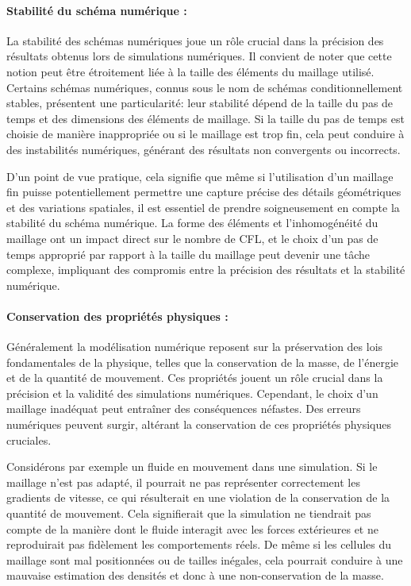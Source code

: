 \paragraph{Stabilité du schéma numérique :}

La stabilité des schémas numériques joue un rôle crucial dans la précision des résultats obtenus lors de simulations numériques. Il convient de noter que cette notion peut être étroitement liée à la taille des éléments du maillage utilisé. Certains schémas numériques, connus sous le nom de schémas conditionnellement stables, présentent une particularité: leur stabilité dépend de la taille du pas de temps et des dimensions des éléments de maillage. Si la taille du pas de temps est choisie de manière inappropriée ou si le maillage est trop fin, cela peut conduire à des instabilités numériques, générant des résultats non convergents ou incorrects.

D'un point de vue pratique, cela signifie que même si l'utilisation d'un maillage fin puisse potentiellement permettre une capture précise des détails géométriques et des variations spatiales, il est essentiel de prendre soigneusement en compte la stabilité du schéma numérique. La forme des éléments et l'inhomogénéité du maillage ont un impact direct sur le nombre de CFL, et le choix d'un pas de temps approprié par rapport à la taille du maillage peut devenir une tâche complexe, impliquant des compromis entre la précision des résultats et la stabilité numérique.


\paragraph{Conservation des propriétés physiques :}

Généralement la modélisation numérique reposent sur la préservation des lois fondamentales de la physique, telles que la conservation de la masse, de l'énergie et de la quantité de mouvement. Ces propriétés jouent un rôle crucial dans la précision et la validité des simulations numériques. Cependant, le choix d'un maillage inadéquat peut entraîner des conséquences néfastes. Des erreurs numériques peuvent surgir, altérant la conservation de ces propriétés physiques cruciales.

Considérons par exemple un fluide en mouvement dans une simulation. Si le maillage n'est pas adapté, il pourrait ne pas représenter correctement les gradients de vitesse, ce qui résulterait en une violation de la conservation de la quantité de mouvement. Cela signifierait que la simulation ne tiendrait pas compte de la manière dont le fluide interagit avec les forces extérieures et ne reproduirait pas fidèlement les comportements réels. De même si les cellules du maillage sont mal positionnées ou de tailles inégales, cela pourrait conduire à une mauvaise estimation des densités et donc à une non-conservation de la masse.


